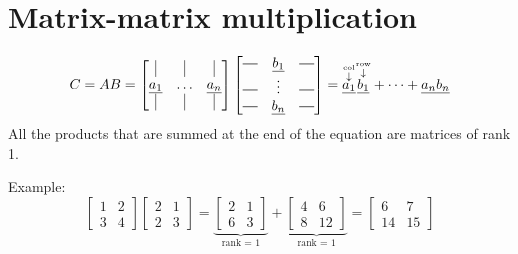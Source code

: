 \section{Matrix-matrix multiplication}
\[
C = AB = \begin{bmatrix}
    \vline & \vline & \vline\\
    \underline{a_1} & \ldots & \underline{a_n}\\
    \vline & \vline & \vline
\end{bmatrix}
\begin{bmatrix}
    \horzbar & \underline{b_1} & \horzbar\\
    \horzbar & \vdots & \horzbar\\
    \horzbar & \underline{b_n} & \horzbar
\end{bmatrix}
= \overset{\overset{\text{col}}{\downarrow}}{\underline{a_1}}\overset{\overset{\text{row}}{\downarrow}}{\underline{b_1}} + \dots + \underline{a_n}\underline{b_n}
\] 
All the products that are summed at the end of the equation are matrices of rank 1. 

Example:
\[
\begin{bmatrix}
1 & 2\\
3 & 4
\end{bmatrix}  
\begin{bmatrix}
    2 & 1\\
    2 & 3
\end{bmatrix}
= \underbrace{
    \begin{bmatrix}
        2 & 1\\
        6 & 3
    \end{bmatrix}
}_{\text{rank = 1}}
+ \underbrace{
    \begin{bmatrix}
        4 & 6\\
        8 & 12
    \end{bmatrix}
}_{\text{rank = 1}}
= \begin{bmatrix}
    6 & 7\\
    14 & 15
\end{bmatrix}
\]



